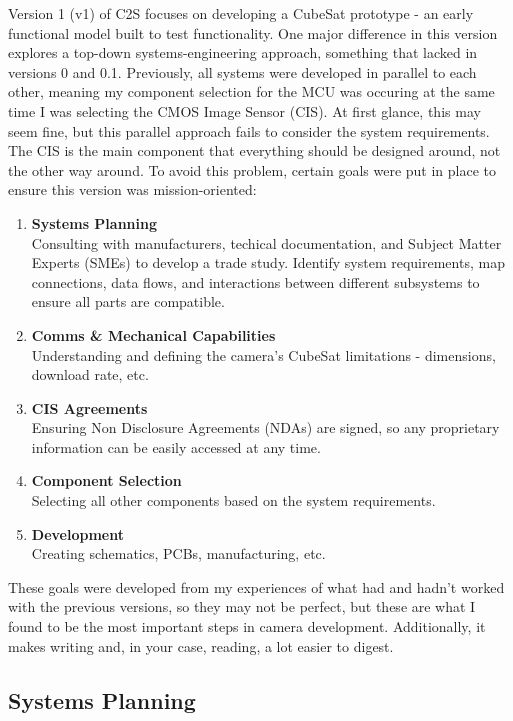 Version 1 (v1) of C2S focuses on developing a CubeSat prototype - an early functional model built to test functionality. One major difference in this version explores a top-down systems-engineering approach, something that lacked in versions 0 and 0.1. Previously, all systems were developed in parallel to each other, meaning my component selection for the MCU was occuring at the same time I was selecting the CMOS Image Sensor (CIS). At first glance, this may seem fine, but this parallel approach fails to consider the system requirements. The CIS is the main component that everything should be designed around, not the other way around. To avoid this problem, certain goals were put in place to ensure this version was mission-oriented:

\begin{enumerate}
    \item \textbf{Systems Planning}
    \\ Consulting with manufacturers, techical documentation, and Subject Matter Experts (SMEs) to develop a trade study. Identify system requirements, map connections, data flows, and interactions between different subsystems to ensure all parts are compatible.
    \item \textbf{Comms \& Mechanical Capabilities}
    \\ Understanding and defining the camera's CubeSat limitations - dimensions, download rate, etc.
    \item \textbf{CIS Agreements}
    \\ Ensuring Non Disclosure Agreements (NDAs) are signed, so any proprietary information can be easily accessed at any time.
    \item \textbf{Component Selection}
    \\ Selecting all other components based on the system requirements.
    \item \textbf{Development}
    \\ Creating schematics, PCBs, manufacturing, etc.
\end{enumerate}

These goals were developed from my experiences of what had and hadn't worked with the previous versions, so they may not be perfect, but these are what I found to be the most important steps in camera development. Additionally, it makes writing and, in your case, reading, a lot easier to digest.

\subsection{Systems Planning}\label{sec:v1-planning}

